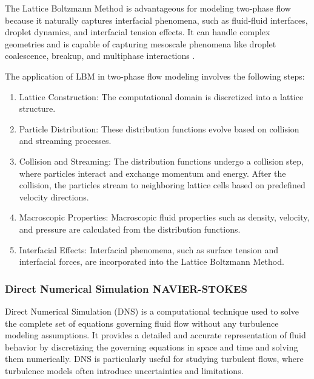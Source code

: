 		The Lattice Boltzmann Method is advantageous for modeling two-phase flow because it naturally captures interfacial phenomena, such as fluid-fluid interfaces, droplet dynamics, and interfacial tension effects. It can handle complex geometries and is capable of capturing mesoscale phenomena like droplet coalescence, breakup, and multiphase interactions \cite{yudistiawan2009higher}.
	
		The application of LBM in two-phase flow modeling involves the following steps:
		
		\begin{enumerate}
			\item Lattice Construction: The computational domain is discretized into a lattice structure.
			
			\item Particle Distribution: These distribution functions evolve based on collision and streaming processes.
			
			\item Collision and Streaming: The distribution functions undergo a collision step, where particles interact and exchange momentum and energy. After the collision, the particles stream to neighboring lattice cells based on predefined velocity directions.
			
			\item Macroscopic Properties: Macroscopic fluid properties such as density, velocity, and pressure are calculated from the distribution functions.
			
			\item Interfacial Effects: Interfacial phenomena, such as surface tension and interfacial forces, are incorporated into the Lattice Boltzmann Method.
			
		\end{enumerate}
		
	\subsubsection{Direct Numerical Simulation NAVIER-STOKES}
	
		Direct Numerical Simulation (DNS) is a computational technique used to solve the complete set of equations governing fluid flow without any turbulence modeling assumptions. It provides a detailed and accurate representation of fluid behavior by discretizing the governing equations in space and time and solving them numerically. DNS is particularly useful for studying turbulent flows, where turbulence models often introduce uncertainties and limitations.

